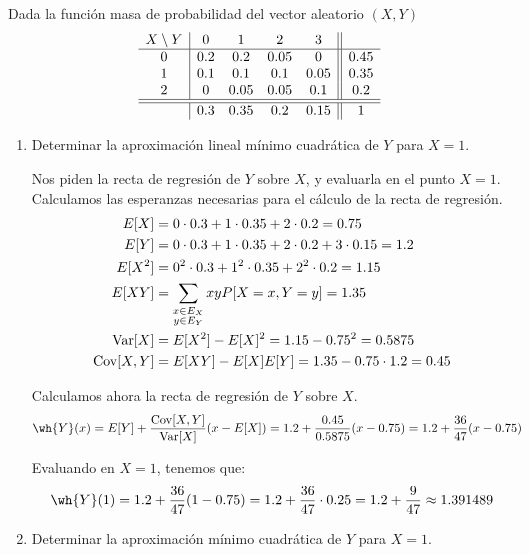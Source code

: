\begin{ejercicio}
    Dada la función masa de probabilidad del vector aleatorio $(X,Y)$
    \begin{equation*}
        \begin{array}{c|cccc||c}
            X\setminus Y & 0 & 1 & 2 & 3\\
            \hline
            0 & 0.2 & 0.2 & 0.05 & 0 & 0.45\\
            1 & 0.1 & 0.1 & 0.1 & 0.05 & 0.35\\
            2 & 0 & 0.05 & 0.05 & 0.1 & 0.2\\
            \hline \hline
            & 0.3 & 0.35 & 0.2 & 0.15 & 1
        \end{array}
    \end{equation*}
    \begin{enumerate}
        \item Determinar la aproximación lineal mínimo cuadrática de $Y$ para $X = 1$.
        
        Nos piden la recta de regresión de $Y$ sobre $X$, y evaluarla en el punto $X=1$.
        Calculamos las esperanzas necesarias para el cálculo de la recta de regresión.
        \begin{align*}
            E[X] &= 0\cdot 0.3 + 1\cdot 0.35 + 2\cdot 0.2 = 0.75\\
            E[Y] &= 0\cdot 0.3 + 1\cdot 0.35 + 2\cdot 0.2 + 3\cdot 0.15 = 1.2\\
            E[X^2] &= 0^2\cdot 0.3 + 1^2\cdot 0.35 + 2^2\cdot 0.2 = 1.15\\
            E[XY] &= \sum_{\substack{x\in E_X\\y\in E_Y}}xyP[X = x, Y = y] = 1.35\\
            \operatorname{Var}[X] &= E[X^2] - E[X]^2 = 1.15 - 0.75^2 = 0.5875\\
            \operatorname{Cov}[X,Y] &= E[XY] - E[X]E[Y] = 1.35 - 0.75\cdot 1.2 = 0.45
        \end{align*}

        Calculamos ahora la recta de regresión de $Y$ sobre $X$.
        \begin{align*}
            \wh{Y}(x) &= E[Y] + \dfrac{\Cov[X,Y]}{\Var[X]}(x - E[X])
            = 1.2 + \dfrac{0.45}{0.5875}(x - 0.75)
            = 1.2 + \dfrac{36}{47}(x - 0.75)
        \end{align*}

        Evaluando en $X=1$, tenemos que:
        \begin{equation*}
            \wh{Y}(1) = 1.2 + \dfrac{36}{47}(1 - 0.75) = 1.2 + \dfrac{36}{47}\cdot 0.25 = 1.2 + \dfrac{9}{47} \approx 1.391489
        \end{equation*}
        \item Determinar la aproximación mínimo cuadrática de $Y$ para $X = 1$.
        

\end{enumerate}
\end{ejercicio}
